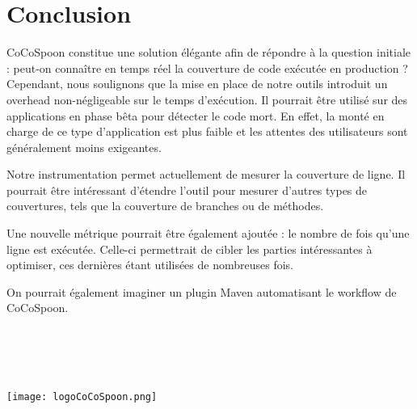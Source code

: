 \chapter*{Conclusion}
	\thispagestyle{conclusion}
	
\par CoCoSpoon constitue une solution élégante afin de répondre à la question initiale : peut-on connaître en temps réel la couverture de code exécutée en production ? Cependant, nous soulignons que la mise en place de notre outils introduit un overhead non-négligeable sur le temps d'exécution. Il pourrait être utilisé sur des applications en phase bêta pour détecter le code mort. En effet, la monté en charge de ce type d'application est plus faible et les attentes des utilisateurs sont généralement moins exigeantes.
\par Notre instrumentation permet actuellement de mesurer la couverture de ligne. Il pourrait être intéressant d'étendre l'outil pour mesurer d'autres types de couvertures, tels que la couverture de branches ou de méthodes. \par Une nouvelle métrique pourrait être également ajoutée : le nombre de fois qu'une ligne est exécutée. Celle-ci permettrait de cibler les parties intéressantes à optimiser, ces dernières étant utilisées de nombreuses fois. \par On pourrait également imaginer un plugin Maven automatisant le workflow de CoCoSpoon.

~\\
~\\
~\\
~\\

\centering
\texttt{[image: logoCoCoSpoon.png]}
